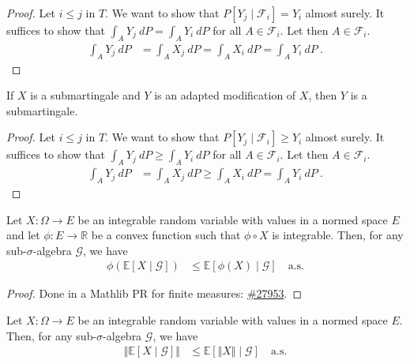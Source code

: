 \begin{proof}\leanok
Let $i \le j$ in $T$. We want to show that $P[Y_j \mid \mathcal{F}_i] = Y_i$ almost surely.
It suffices to show that $\int_A Y_j \: dP = \int_A Y_i \: dP$ for all $A \in \mathcal{F}_i$.
Let then $A \in \mathcal{F}_i$.
\begin{align*}
  \int_A Y_j \: dP
  &= \int_A X_j \: dP
  = \int_A X_i \: dP
  = \int_A Y_i \: dP
  \: .
\end{align*}
\end{proof}


\begin{lemma}\label{lem:Submartingale.congr}
  \leanok
If $X$ is a submartingale and $Y$ is an adapted modification of $X$, then $Y$ is a submartingale.
\end{lemma}

\begin{proof}\leanok
Let $i \le j$ in $T$. We want to show that $P[Y_j \mid \mathcal{F}_i] \ge Y_i$ almost surely.
It suffices to show that $\int_A Y_j \: dP \ge \int_A Y_i \: dP$ for all $A \in \mathcal{F}_i$.
Let then $A \in \mathcal{F}_i$.
\begin{align*}
  \int_A Y_j \: dP
  &= \int_A X_j \: dP
  \ge \int_A X_i \: dP
  = \int_A Y_i \: dP
  \: .
\end{align*}
\end{proof}


\begin{lemma}\label{lem:conditional_jensen}
  \mathlibok
Let $X : \Omega \to E$ be an integrable random variable with values in a normed space $E$ and let $\phi : E \to \mathbb{R}$ be a convex function such that $\phi \circ X$ is integrable.
Then, for any sub-$\sigma$-algebra $\mathcal{G}$, we have
\begin{align*}
  \phi\left( \mathbb{E}[X \mid \mathcal{G}] \right)
  &\le \mathbb{E}[\phi(X) \mid \mathcal{G}] \quad \text{a.s.}
\end{align*}
\end{lemma}

\begin{proof}\leanok
Done in a Mathlib PR for finite measures: \href{https://github.com/leanprover-community/mathlib4/pull/27953}{\#27953}.
\end{proof}


\begin{corollary}\label{cor:norm_condExp_le}
  \leanok
Let $X : \Omega \to E$ be an integrable random variable with values in a normed space $E$.
Then, for any sub-$\sigma$-algebra $\mathcal{G}$, we have
\begin{align*}
  \Vert \mathbb{E}[X \mid \mathcal{G}] \Vert
  &\le \mathbb{E}[\Vert X \Vert \mid \mathcal{G}] \quad \text{a.s.}
\end{align*}
\end{corollary}

